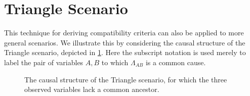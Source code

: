 \section{Triangle Scenario}
This technique for deriving compatibility criteria can also be applied to more general scenarios. We illustrate this by considering the causal structure of the Triangle scenario, depicted in \cref{fig:TriDAG}. Here the subscript notation is used merely to label the pair of variables $A,B$ to which $\Lambda_{AB}$ is a common cause. 
\begin{figure}[!t]
\caption{The causal structure of the Triangle scenario, for which the three observed variables lack a common ancestor.}
 \label{fig:TriDAG}
\end{figure}

